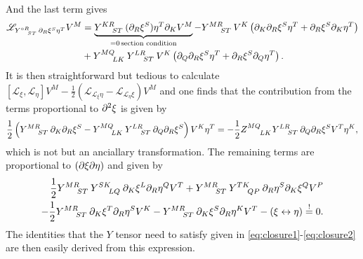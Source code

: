 And the last term gives 
\begin{equation}
    \begin{aligned}
        \mathscr{L}_{\tensor{Y}{^{\circ R}_{ST}}\pd_R\xi^S\eta^T}V^M &= \underbrace{\tensor{Y}{^{KR}_{ST}}(\pd_R\xi^S)\eta^T\pd_KV^M}_{=0\, \text{section condition}}-\tensor{Y}{^{MR}_{ST}}V^K\left(\pd_K\pd_R\xi^S\eta^T+\pd_R\xi^S\pd_K\eta^T\right)\\
        &+\tensor{Y}{^{MQ}_{LK}}\tensor{Y}{^{LR}_{ST}}V^K\left(\pd_Q\pd_R\xi^S\eta^T+\pd_R\xi^S\pd_Q\eta^T\right).
    \end{aligned}
\end{equation}
It is then straightforward but tedious to calculate $[\mathscr{L}_\xi,\mathscr{L}_\eta] V^M-\frac{1}{2}(\mathscr{L}_{\mathscr{L}_\xi\eta}-\mathscr{L}_{\mathscr{L}_\eta\xi})V^M$ and one finds that the contribution from the terms proportional to $\partial^2\xi$ is given by
\begin{equation}
    \frac{1}{2}\left(\tensor{Y}{^{MR}_{ST}}\pd_K\pd_R\xi^S-\tensor{Y}{^{MQ}_{LK}}\tensor{Y}{^{LR}_{ST}}\pd_Q\pd_R\xi^S\right)V^K\eta^T = -\frac{1}{2}\tensor{Z}{^{MQ}_{LK}}\tensor{Y}{^{LR}_{ST}}\pd_Q\pd_R\xi^SV^T\eta^K,
\end{equation}
which is not but an anciallary transformation. The remaining terms are proportional to $(\partial\xi\partial\eta)$ and given by 
\begin{equation}
    \begin{aligned}
        \frac{1}{2}\tensor{Y}{^{MR}_{ST}}\tensor{Y}{^{SK}_{LQ}}\pd_K\xi^L\pd_R\eta^QV^T+\tensor{Y}{^{MR}_{ST}}\tensor{Y}{^{TK}_{QP}}\pd_R\eta^S\pd_K\xi^QV^P\\
        -\frac{1}{2}\tensor{Y}{^{MR}_{ST}}\pd_K\xi^T\pd_R\eta^SV^K-\tensor{Y}{^{MR}_{ST}}\pd_K\xi^S\pd_R\eta^KV^T-(\xi\leftrightarrow\eta) \overset{!}{=}0.
    \end{aligned}
\end{equation}
The identities that the $Y$ tensor need to satisfy given in \eqref{eq:closure1}-\eqref{eq:closure2} are then easily derived from this expression. 

